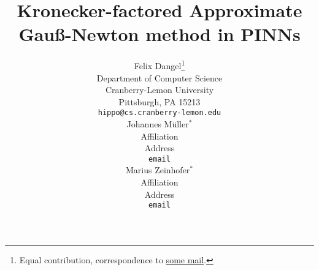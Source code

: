 \newcommand{\papertitle}{%
  Kronecker-factored Approximate Gauß-Newton method in PINNs 
}
\title{\papertitle}

%

\author{%
  Felix Dangel\thanks{Equal contribution, correspondence to \url{some mail}.}\\
  Department of Computer Science\\
  Cranberry-Lemon University\\
  Pittsburgh, PA 15213 \\
  \texttt{hippo@cs.cranberry-lemon.edu} \\
  \And
  Johannes M\"uller$^*$\\
  Affiliation \\
  Address \\
  \texttt{email} \\
  \And
  Marius Zeinhofer$^*$\\
  Affiliation \\
  Address \\
  \texttt{email} \\
}
